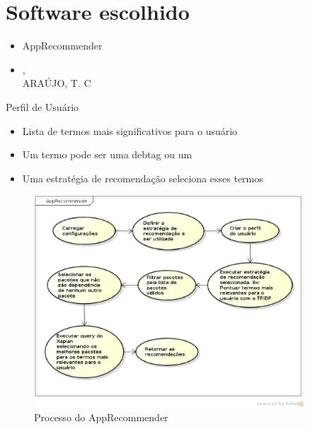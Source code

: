 
\section{Software escolhido} %
\label{sec:software_escolhido}
\begin{frame}
\begin{itemize}
    \item AppRecommender

    \item {}, \\ARAÚJO, T. C
\end{itemize}
\end{frame}

\begin{frame}
    Perfil de Usuário

\begin{itemize}
    \item Lista de termos mais significativos para o usuário
    \item Um termo pode ser uma debtag ou um
    \item Uma estratégia de recomendação seleciona esses termos
\end{itemize}
\end{frame}

\begin{frame}
\begin{figure}[h]
  \centering
  \includegraphics[width=0.9\textwidth]{figura/app_recommender_process.eps}
  \caption{Processo do AppRecommender}
  \label{fig:curva_aprendizado}
\end{figure}
\end{frame}

